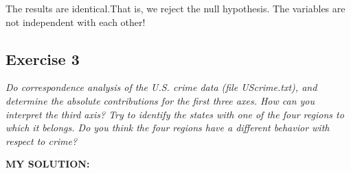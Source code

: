 \documentclass[
]{article}
\begin{document}
The results are identical.That is, we reject the null hypothesis. The
variables are not independent with each other!

\hypertarget{exercise-3}{%
\subsection{Exercise 3}\label{exercise-3}}

\emph{Do correspondence analysis of the U.S. crime data (file
UScrime.txt), and determine the absolute contributions for the first
three axes. How can you interpret the third axis? Try to identify the
states with one of the four regions to which it belongs. Do you think
the four regions have a different behavior with respect to crime?}

\textbf{MY SOLUTION:}
\end{document}

